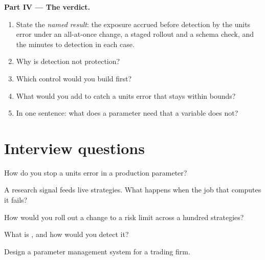 \begin{problem}
\medskip\noindent\textbf{Part IV --- The verdict.}
\begin{enumerate}[resume]
\item State the \emph{named result}: the exposure accrued before detection by the units error under an all-at-once change, a staged rollout
and a schema check, and the minutes to detection in each case.
\item Why is detection not protection?
\item Which control would you build first?
\item What would you add to catch a units error that stays within bounds?
\item In one sentence: what does a parameter need that a variable does not?
\end{enumerate}
\end{problem}

\section{Interview questions}

\begin{interviewq}\label{iq:pl:signal-serving-and-parameter-management:1}
How do you stop a units error in a production parameter?
\end{interviewq}

\begin{interviewq}\label{iq:pl:signal-serving-and-parameter-management:2}
A research signal feeds live strategies. What happens when the job that computes it fails?
\end{interviewq}

\begin{interviewq}\label{iq:pl:signal-serving-and-parameter-management:3}
How would you roll out a change to a risk limit across a hundred strategies?
\end{interviewq}

\begin{interviewq}\label{iq:pl:signal-serving-and-parameter-management:4}
What is , and how would you detect it?
\end{interviewq}

\begin{interviewq}\label{iq:pl:signal-serving-and-parameter-management:5}
Design a parameter management system for a trading firm.
\end{interviewq}
